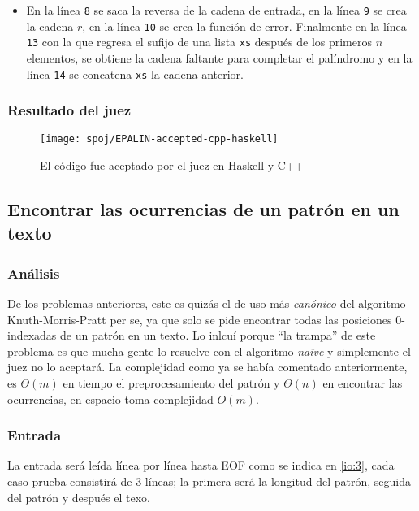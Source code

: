 \begin{itemize}
\item En la línea \texttt{8} se saca la reversa de la cadena de entrada, en la línea \texttt{9}
se crea la cadena $r$, en la línea \texttt{10} se crea la función de error. Finalmente en la línea
\texttt{13} con la  que regresa el sufijo de una lista
\texttt{xs} después de los primeros $n$ elementos, se obtiene la cadena faltante para completar el
palíndromo y en la línea \texttt{14} se concatena \texttt{xs} la cadena anterior.
\end{itemize}

\subsubsection{Resultado del juez}
\begin{figure}[H]
\centering
\texttt{[image: spoj/EPALIN-accepted-cpp-haskell]}
\caption{El código fue aceptado por el juez en Haskell y C++}
\end{figure}

\newpage


\subsection{Encontrar las ocurrencias de un patrón en un texto}

\subsubsection{Análisis}
De los problemas anteriores, este es quizás el de uso más \textit{canónico} del 
algoritmo Knuth-Morris-Pratt per se, ya que solo se pide encontrar todas las 
posiciones 0-indexadas de un patrón en un texto. Lo inlcuí porque ``la trampa'' 
de este problema es que mucha gente lo
resuelve con el algoritmo \textit{naïve} y simplemente el juez no lo aceptará. La complejidad como
ya se había comentado anteriormente, es $\Theta(m)$ en tiempo el 
preprocesamiento del patrón y
$\Theta(n)$ en encontrar las ocurrencias, en espacio toma complejidad $O(m)$.

\subsubsection{Entrada}
La entrada será leída línea por línea hasta EOF como se indica en \ref{io:3}, 
cada caso prueba consistirá de 3 líneas; la primera será la longitud del patrón, 
seguida del patrón y después el texo.

